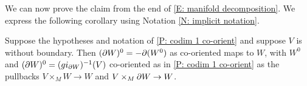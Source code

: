 We can now prove the claim from the end of \cref{E: manifold decomposition}.
We express the following corollary using Notation \ref{N: implicit notation}.

\begin{corollary}\label{C: co-orient W0}
	Suppose the hypotheses and notation of \cref{P: codim 1 co-orient} and suppose $V$ is without boundary.
	Then $(\partial W)^0 = -\partial (W^0)$ as co-oriented maps to $W$, with $W^0$ and $(\partial W)^0 = (gi_{\partial W})^{-1}(V)$ co-oriented as in \cref{P: codim 1 co-orient} as the pullbacks $V \times_M W \to W$ and $V \times_M \partial W \to W$.
\end{corollary}


